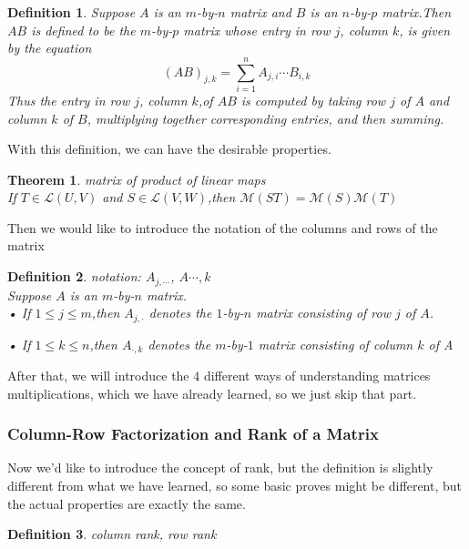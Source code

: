 \documentclass{article}
\newtheorem{theorem}{Theorem}[subsection]
\newtheorem{definition}{Definition}[subsection]
\begin{document}
\begin{CJK}{UTF8}{gkai}
\begin{definition}
    Suppose $A$ is an $m$-by-$n$ matrix and $B$ is an $n$-by-$p $ matrix.Then $AB$ is defined to be the $m$-by-$p$ matrix whose entry in row $j$, column $k$, is given by the equation
    \[(AB)_{j,k} = \sum_{i = 1}^n A_{j,i}\cdots B_{i,k}\]
    Thus the entry in row $j$, column $k$,of $AB$ is computed by taking row $j$ of $A$ and column $k$ of $B$, multiplying together corresponding entries, and then summing.
\end{definition}
    
With this definition, we can have the desirable properties.
\begin{theorem}
    matrix of product of linear maps\\

    If $T \in \mathcal{L}(U,V)$ and $S \in \mathcal{L}(V,W)$,then $\mathcal{M}(ST) = \mathcal{M}(S)\mathcal{M}(T)$
\end{theorem}

Then we would like to introduce the notation of the columns and rows of the matrix\\

\begin{definition}
    notation: $A_{j,\cdots}$, $A{\cdots,k}$\\

    Suppose $A$ is an $m$-by-$n$ matrix.\\

    • If $1 \leq j \leq m$,then $A_{j,\cdot}$ denotes the $1$-by-$n$ matrix consisting of row $j$ of $A$.

    • If $1 \leq k \leq n$,then $A_{\cdot,k}$ denotes the $m$-by-$1$ matrix consisting of column $k$ of A
\end{definition}

After that, we will introduce the $4$ different ways of understanding matrices multiplications, which we have already learned, so we just skip that part.\\

\subsubsection{Column-Row Factorization and Rank of a Matrix}

Now we'd like to introduce the concept of rank, but the definition is slightly different from what we have learned, so some basic proves might be different, but the actual properties are exactly the same.\\

\begin{definition}
    column rank, row rank\\


\end{definition}
\end{CJK}
\end{document}
